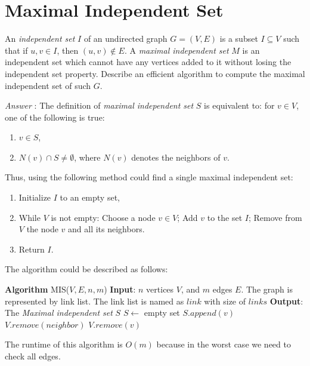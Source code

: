 \documentclass[11pt]{article}
\begin{document}
\section{Maximal Independent Set}
An \emph{independent set} $I$ of an undirected graph $G=(V,E)$ is a subset $I\subseteq V$ such that if $u,v \in I$, then $(u,v)\not \in E$. A \emph{maximal independent set} $M$ is an independent set which cannot have any vertices added to it without losing the independent set property. Describe an efficient algorithm to compute the maximal independent set of such $G$.

\noindent\emph{Answer} : The definition of \emph{maximal independent set} $S$ is equivalent to: for $v\in V$, one of the following is true:
\begin{enumerate}
	\item $v\in S$,
	\item $N(v)\cap S \not = \emptyset$, where $N(v)$ denotes the neighbors of $v$.
\end{enumerate}

Thus, using the following method could find a single maximal independent set:
\begin{enumerate}
	\item Initialize $I$ to an empty set,
	\item While $V$ is not empty:
		\subitem Choose a node $v\in V$;
		\subitem Add $v$ to the set $I$;
		\subitem Remove from $V$ the node $v$ and all its neighbors.
	\item Return $I$.
\end{enumerate}

The algorithm could be described as follows:
\begin{algorithmic}
	\State \textbf{Algorithm} MIS($V,E,n,m$)
	\State \textbf{Input}: $n$ vertices $V$, and $m$ edges $E$. The graph is represented by link list. The link list is named as $link$ with size of $links$
	\State \textbf{Output}: The \emph{Maximal independent set} $S$
	\State $S\gets$ empty set
			\State $S.append(v)$
				\State $V.remove(neighbor)$
			\EndFor
			\State $V.remove(v)$
		\EndFor
	\EndWhile
\end{algorithmic}

The runtime of this algorithm is $O(m)$ because in the worst case we need to check all edges.
\end{document}
